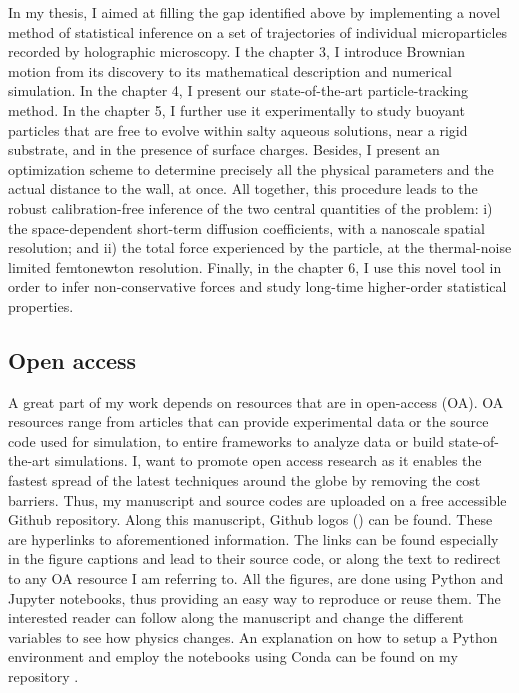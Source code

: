 In my thesis, I aimed at filling the gap identified above by implementing a novel method of statistical inference on a set of trajectories of individual microparticles recorded by holographic microscopy. I the chapter 3, I introduce Brownian motion from its discovery to its mathematical description and numerical simulation. In the chapter 4, I present our state-of-the-art particle-tracking method. In the chapter 5, I further use it experimentally to study  buoyant particles that are free to evolve within salty aqueous solutions, near a rigid substrate, and in the presence of surface charges. Besides, I present an optimization scheme to determine precisely all the physical parameters and the actual distance to the wall, at once. All together, this procedure leads to the robust calibration-free inference of the two central quantities of the problem: i) the space-dependent short-term diffusion coefficients, with a nanoscale spatial resolution; and ii) the total force experienced by the particle, at the thermal-noise limited femtonewton resolution. Finally, in the chapter 6, I use this novel tool in order to infer non-conservative forces and study long-time higher-order statistical properties.



\subsection{Open access}

A great part of my work depends on resources that are in open-access (OA). OA resources range from articles that can provide experimental data or the source code used for simulation, to entire frameworks to analyze data or build state-of-the-art simulations. I, want to promote open access research as it enables the fastest spread of the latest techniques around the globe by removing the cost barriers. Thus, my manuscript and source codes are uploaded on a free accessible Github repository. Along this manuscript, Github logos (\href{https://github.com/eXpensia/Ma-these/}{\faGithub}) can be found. These are hyperlinks to aforementioned information. The links can be found especially in the figure captions and lead to their source code, or along the text to redirect to any OA resource I am referring to. All the figures, are done using Python and Jupyter notebooks, thus providing an easy way to reproduce or reuse them. The interested reader can follow along the manuscript and change the different variables to see how physics changes.  An explanation on how to setup a Python environment and employ the notebooks using Conda can be found on my repository \href{https://github.com/eXpensia/Ma-these/}{\faGithub}.



